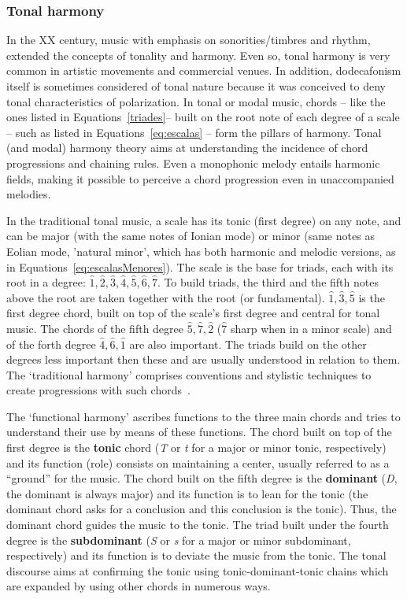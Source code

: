 \subsubsection{Tonal harmony}
In the XX century, music with emphasis on sonorities/timbres and rhythm, extended the concepts of tonality and harmony. Even so, tonal harmony is very common in artistic movements and commercial venues. In addition, dodecafonism itself is sometimes considered of tonal nature because it was conceived to deny tonal characteristics of polarization.
In tonal or modal music, chords -- like the ones listed in
Equations~\ref{triades}-- built on the root note of each degree of a scale  -- such as listed in Equations~\ref{eq:escalas} --  form the pillars of harmony.
Tonal (and modal) harmony theory aims at understanding the incidence of chord progressions and chaining rules.
Even a monophonic melody entails harmonic fields, making it possible to perceive a chord progression even in unaccompanied melodies.

In the traditional tonal music, a scale has its tonic (first
degree) on any note, and can be major (with the same notes of Ionian mode) or minor (same notes as Eolian mode, 'natural minor', which has both harmonic and melodic versions, as in Equations~\ref{eq:escalasMenores}). The
scale is the base for triads, each with its root in a degree: $\hat{1},\hat{2},\hat{3},\hat{4},\hat{5},\hat{6},\hat{7}$.
To build triads, the third and the fifth notes above the root are taken together with the root (or fundamental).
$\hat{1},\hat{3},\hat{5}$ is the first degree chord,
 built on top of the scale's first degree and central for tonal music. The chords of the fifth degree $\hat{5},\hat{7},\hat{2}$ ($\hat{7}$ sharp when in a minor scale) and of the forth degree $\hat{4},\hat{6},\hat{1}$ are also important. The triads build on the other degrees less important then these and are usually understood in relation to them. The `traditional harmony' comprises conventions and stylistic techniques to create progressions with such chords~\cite{Harmonia}. 

The `functional harmony' ascribes functions to the three main chords and tries to understand their use by means of these functions. The chord built on top of the first degree is the \textbf{tonic} chord (\textit{T} or \textit{t} for a major or minor tonic, respectively) and its function (role) consists on maintaining a center, usually referred to as a ``ground'' for the music. The chord built on the fifth degree is the \textbf{dominant} (\textit{D}, the dominant is always major) and its function is to lean for the tonic
(the dominant chord asks for a conclusion and this conclusion is the tonic). Thus, the dominant chord guides the music to the tonic. The triad built under the fourth degree is the \textbf{subdominant} (\textit{S} or \textit{s} for a major or minor
subdominant, respectively) and its function is to deviate the music from the tonic. The tonal discourse aims at confirming the tonic using tonic-dominant-tonic chains which are expanded by using other chords in numerous ways.


